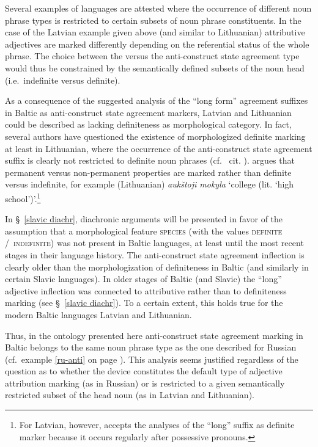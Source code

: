 Several examples of languages are attested where the occurrence of different noun phrase types is restricted to certain subsets of noun phrase constituents. In the case of the Latvian example given above (and similar to Lithuanian) attributive adjectives are marked differently depending on the referential status of the whole phrase. The choice between the  versus the anti\hyp{}construct state agreement type would thus be constrained by the semantically defined subsets of the noun head (i.e.~indefinite versus definite). 

As a consequence of the suggested analysis of the “long form” agreement suffixes in Baltic as anti\hyp{}construct state agreement markers, Latvian and Lithuanian could be described as lacking definiteness as morphological category. In fact, several authors have questioned the existence of morphologized definite marking at least in Lithuanian, where the occurrence of the anti\hyp{}construct state agreement suffix is clearly not restricted to definite noun phrases (cf.~\citealt{wissemann1958} cit. \citealt[181–182]{kramsky1972}). \citet[37]{trost1966} argues that permanent versus non-permanent properties are marked rather than definite versus indefinite, for example (Lithuanian) \textit{aukštoji mokyla} ‘college (lit. ‘high school’)’.\footnote{For Latvian, however, \citet[38]{trost1966} accepts the analyses of the “long” suffix as definite marker because it occurs regularly after possessive pronouns.}

In \S~\ref{slavic diachr}, diachronic arguments will be presented in favor of the assumption that a morphological feature \textsc{species} (with the values \textsc{definite} /~\textsc{indefinite}) was not present in Baltic languages, at least until the most recent stages in their language history. The anti\hyp{}construct state agreement inflection is clearly older than the morphologization of definiteness in Baltic (and similarly in certain Slavic languages). In older stages of Baltic (and Slavic) the “long” adjective inflection was connected to attributive rather than to definiteness marking (see \S~\ref{slavic diachr}). To a certain extent, this holds true for the modern Baltic languages Latvian and Lithuanian.

Thus, in the ontology presented here anti\hyp{}construct state agreement marking in Baltic belongs to the same noun phrase type as the one described for Russian (cf.~example \ref{ru-anti} on page \pageref{ru-anti}). This analysis seems justified regardless of the question as to whether the device constitutes the default type of adjective attribution marking (as in Russian) or is restricted to a given semantically restricted subset of the head noun (as in Latvian and Lithuanian).

